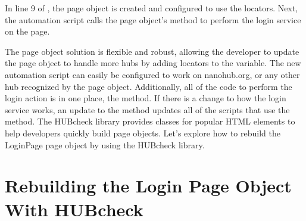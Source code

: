 In line 9 of , the page object
is created and configured to use the  locators. Next, the
automation script calls the page object's  method to
perform the login service on the page.

The page object solution is flexible and robust, allowing the developer to
update the page object to handle more hubs by adding locators to the
 variable. The new automation script can easily be configured
to work on nanohub.org, or any other hub recognized by the page object.
Additionally, all of the code to perform the login action is in one place, the
 method. If there is a change to how the login service
works, an update to the  method updates all of the scripts
that use the method. The HUBcheck library provides classes for popular HTML
elements to help developers quickly build page objects. Let's explore how to
rebuild the LoginPage page object by using the HUBcheck library.



\section{Rebuilding the Login Page Object With HUBcheck}
\label{sec:rebuilding_login_page_object_with_hubcheck}



%
%
%
%

